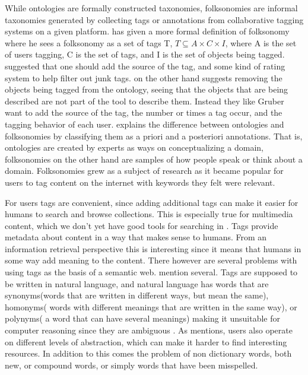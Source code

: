 While ontologies are formally constructed taxonomies, folksonomies are informal taxonomies generated by collecting tags or annotations from collaborative tagging systems on a given platform\citep{Tang2009}.
\citet{Mika2005} has given a more formal definition of folksonomy where he sees a folksonomy as a set of tags T,
$T \subseteq A \times C \times I$, where A is the set of users tagging, C is the set of tags, and I is the set of objects being tagged.
\citet{Gruber2007} suggested that one should add the source of the tag, and some kind of rating system to help filter out junk tags.
\citet{Scerri2008} on the other hand suggests removing the objects being tagged from the ontology,
seeing that the objects that are being described are not part of the tool to describe them.
Instead they like Gruber want to add the source of the tag, the number or times a tag occur, and the tagging behavior of each user.
\citet{Bang2008} explains the difference between ontologies and folksonomies by classifying them as a priori and a posteriori annotations.
That is, ontologies are created by experts as ways on conceptualizing a domain, folksonomies on the other hand are samples of how people speak or think about a domain.
Folksonomies grew as a subject of research as it became popular for users to tag content on the internet with keywords they felt were relevant.

For users tags are convenient, since adding additional tags can make it easier for humans to search and browse collections.
This is especially true for multimedia content, which we don't yet have good tools for searching in \citep{Weinberger2008}.
Tags provide metadata about content in a way that makes sense to humans.
From an information retrieval perspective this is interesting since it means that humans in some way add meaning to the content.
There however are several problems with using tags as the basis of a semantic web.
\citet{Tang2009} mention several.
Tags are supposed to be written in natural language, and natural language has words that are synonyms(words that are written in different ways,
but mean the same), homonyms( words with different meanings that are written in the same way), or polynyms( a word that can have several meanings)
making it unsuitable for computer reasoning since they are ambiguous \citep{Passant2008}.
As \citet{Golder2005} mentions, users also operate on different levels of abstraction, which can make it harder to find interesting resources.
In addition to this comes the problem of non dictionary words, both new, or compound words, or simply words that have been misspelled\citep{Tonkin2006}.


